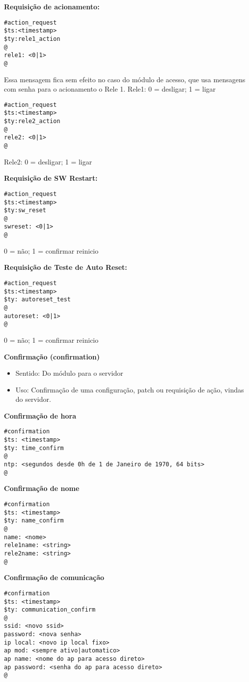 \textbf{Requisição de acionamento:}
\begin{lstlisting}
#action_request
$ts:<timestamp>
$ty:rele1_action 
@
rele1: <0|1>
@
\end{lstlisting}
Essa mensagem fica sem efeito no caso do módulo de acesso, que usa mensagens com senha para o acionamento o Rele 1.
Rele1: 0 = desligar; 1 = ligar

\begin{lstlisting}
#action_request
$ts:<timestamp>
$ty:rele2_action
@
rele2: <0|1>
@
\end{lstlisting}
Rele2: 0 = desligar; 1 = ligar

\textbf{Requisição de SW Restart:}
\begin{lstlisting}
#action_request
$ts:<timestamp>
$ty:sw_reset
@
swreset: <0|1>
@
\end{lstlisting}
0 = não; 1 = confirmar reinicio

\textbf{Requisição de Teste de Auto Reset:}
\begin{lstlisting}
#action_request
$ts:<timestamp>
$ty: autoreset_test
@
autoreset: <0|1>
@
\end{lstlisting}
0 = não; 1 = confirmar reinicio

\textbf{Confirmação (confirmation)}
\begin{itemize}
\item Sentido: Do módulo para o servidor
\item Uso: Confirmação de uma configuração, patch ou requisição de ação, vindas do servidor.
\end{itemize}

\textbf{Confirmação de hora}
\begin{lstlisting}
#confirmation
$ts: <timestamp>
$ty: time_confirm
@
ntp: <segundos desde 0h de 1 de Janeiro de 1970, 64 bits>
@
\end{lstlisting}

\textbf{Confirmação de nome}
\begin{lstlisting}
#confirmation
$ts: <timestamp>
$ty: name_confirm
@
name: <nome>
rele1name: <string>
rele2name: <string>
@
\end{lstlisting}

\textbf{Confirmação de comunicação}
\begin{lstlisting}
#confirmation
$ts: <timestamp>
$ty: communication_confirm
@
ssid: <novo ssid>
password: <nova senha>
ip local: <novo ip local fixo>
ap mod: <sempre ativo|automatico>
ap name: <nome do ap para acesso direto>
ap password: <senha do ap para acesso direto>
@
\end{lstlisting}

